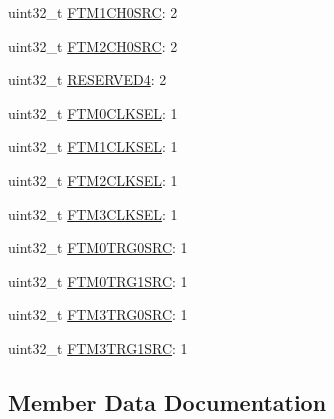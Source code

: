 \begin{DoxyCompactItemize}
\item 
uint32\+\_\+t \hyperlink{struct__hw__sim__sopt4_1_1__hw__sim__sopt4__bitfields_aeee6126f7b82e3a50bcd2ff0a0d21c24}{F\+T\+M1\+C\+H0\+S\+RC}\+: 2
\item 
uint32\+\_\+t \hyperlink{struct__hw__sim__sopt4_1_1__hw__sim__sopt4__bitfields_a150756ef05e7e68b590c23b01fd55ca6}{F\+T\+M2\+C\+H0\+S\+RC}\+: 2
\item 
uint32\+\_\+t \hyperlink{struct__hw__sim__sopt4_1_1__hw__sim__sopt4__bitfields_a546a8064994bc2770915b77a74824a34}{R\+E\+S\+E\+R\+V\+E\+D4}\+: 2
\item 
uint32\+\_\+t \hyperlink{struct__hw__sim__sopt4_1_1__hw__sim__sopt4__bitfields_a50b0390acefe3639e4d83137640d93b8}{F\+T\+M0\+C\+L\+K\+S\+EL}\+: 1
\item 
uint32\+\_\+t \hyperlink{struct__hw__sim__sopt4_1_1__hw__sim__sopt4__bitfields_ada3cfe7a39773b93e283f8dfe183d557}{F\+T\+M1\+C\+L\+K\+S\+EL}\+: 1
\item 
uint32\+\_\+t \hyperlink{struct__hw__sim__sopt4_1_1__hw__sim__sopt4__bitfields_a143120ee0d80ecb07ab64b28038bd0bb}{F\+T\+M2\+C\+L\+K\+S\+EL}\+: 1
\item 
uint32\+\_\+t \hyperlink{struct__hw__sim__sopt4_1_1__hw__sim__sopt4__bitfields_ac487f3f7c9deb161265d421b771e5870}{F\+T\+M3\+C\+L\+K\+S\+EL}\+: 1
\item 
uint32\+\_\+t \hyperlink{struct__hw__sim__sopt4_1_1__hw__sim__sopt4__bitfields_a25e854c19bd69210462791a2b5b11619}{F\+T\+M0\+T\+R\+G0\+S\+RC}\+: 1
\item 
uint32\+\_\+t \hyperlink{struct__hw__sim__sopt4_1_1__hw__sim__sopt4__bitfields_accd5797361cc0f5df32c601db4586f63}{F\+T\+M0\+T\+R\+G1\+S\+RC}\+: 1
\item 
uint32\+\_\+t \hyperlink{struct__hw__sim__sopt4_1_1__hw__sim__sopt4__bitfields_a2de6d828fc65c0d445ff50214eaf1a9b}{F\+T\+M3\+T\+R\+G0\+S\+RC}\+: 1
\item 
uint32\+\_\+t \hyperlink{struct__hw__sim__sopt4_1_1__hw__sim__sopt4__bitfields_ad938f2086d69b523bb11c212da02bce1}{F\+T\+M3\+T\+R\+G1\+S\+RC}\+: 1
\end{DoxyCompactItemize}


\subsection{Member Data Documentation}
